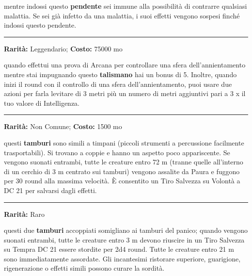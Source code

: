 \begin{multicols}{2}
mentre indossi questo \textbf{pendente} sei immune alla possibilità di contrarre qualsiasi malattia. Se sei già infetto da una malattia, i suoi effetti vengono sospesi finché indossi questo pendente.

\smallskip\noindent\rule{\linewidth}{2pt}  \hypertarget{TalismanodellaSfera}{}\smallskip{}\noindent\label{TalismanodellaSfera}

\textbf{Rarità:} Leggendario; \textbf{Costo:} 75000 mo

quando effettui una prova di Arcana per controllare una sfera dell'annientamento mentre stai impugnando questo \textbf{talismano} hai un bonus di 5. Inoltre, quando inizi il round con il controllo di una sfera dell'annientamento, puoi usare due azioni per farla levitare di 3 metri più un numero di metri aggiuntivi pari a 3 x il tuo valore di Intelligenza.

\smallskip\noindent\rule{\linewidth}{2pt}  \hypertarget{TamburidelPanico}{}\smallskip{}\noindent\label{TamburidelPanico}

\textbf{Rarità:} Non Comune; \textbf{Costo:} 1500 mo

questi \textbf{tamburi} sono simili a timpani (piccoli strumenti a percussione facilmente trasportabili). Si trovano a coppie e hanno un aspetto poco appariscente. Se vengono suonati entrambi, tutte le creature entro 72 m (tranne quelle all'interno di un cerchio di 3 m centrato sui tamburi) vengono assalite da Paura e fuggono per 30 round alla massima velocità. È consentito un Tiro Salvezza su Volontà a DC 21 per salvarsi dagli effetti.

\smallskip\noindent\rule{\linewidth}{2pt}  \hypertarget{TamburidelloStordimento}{}\smallskip{}\noindent\label{TamburidelloStordimento}

\textbf{Rarità:} Raro

questi due \textbf{tamburi} accoppiati somigliano ai tamburi del panico; quando vengono suonati entrambi, tutte le creature entro 3 m devono riuscire in un Tiro Salvezza su Tempra DC 21 essere stordite per 2d4 round. Tutte le creature entro 21 m sono immediatamente assordate. Gli incantesimi ristorare superiore, guarigione, rigenerazione o effetti simili possono curare la sordità.


\end{multicols}
